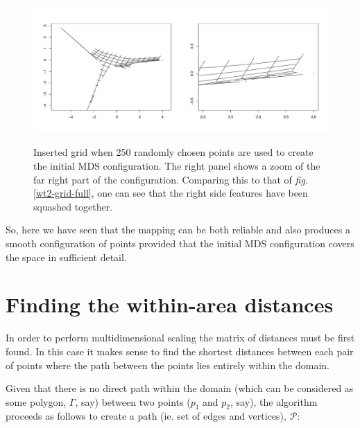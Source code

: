 \documentclass[a4paper,10pt]{article}
\newcommand{\fig}[1]{\emph{fig.} \ref{#1}}
\begin{document}
\begin{figure}
\centering
\includegraphics[width=5in]{figs/wt2-grid-samp.pdf} \\
\caption{Inserted grid when 250 randomly chosen points are used to create the initial MDS configuration. The right panel shows a zoom of the far right part of the configuration. Comparing this to that of \fig{wt2-grid-full}, one can see that the right side features have been squashed together.}
\label{wt2-grid-samp}
\end{figure}

So, here we have seen that the mapping can be both reliable and also produces a smooth configuration of points provided that the initial MDS configuration covers the space in sufficient detail.


\section{Finding the within-area distances}

In order to perform multidimensional scaling the matrix of distances must be first found. In this case it makes sense to find the shortest distances between each pair of points where the path between the points lies entirely within the domain.

Given that there is no direct path within the domain (which can be considered as some polygon, $\Gamma$, say) between two points ($p_1$ and $p_2$, say), the algorithm proceeds as follows to create a path (ie. set of edges and vertices), $\mathcal{P}$:
\end{document}
